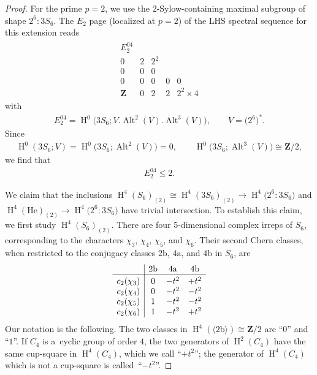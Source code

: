 \documentclass[pdftex]{sigma}
\numberwithin{equation}{section}
\newcommand\bZ{\mathbf Z}
\newcommand\ra{\mathrm a}
\newcommand\rb{\mathrm b}
\DeclareMathOperator\homology{H}
\renewcommand\H{\homology}
\newcommand\<\langle
\renewcommand\>\rangle
\DeclareMathOperator\Alt{Alt}
\begin{document}
\begin{proof}
 For the prime $p=2$, we use the $2$-Sylow-containing maximal subgroup of shape $2^6:3S_6$. The $E_2$ page (localized at $p=2$) of the LHS spectral sequence for this extension reads
 \begin{gather*} \begin{array}{ccccc}
 E_2^{04} \\
 0 & 2 & 2^2 \\
 0 & 0 & 0 \\
 0 & 0 & 0 & 0 & 0 \\
 \bZ & 0 & 2 & 2 & 2^2\times 4
 \end{array} \end{gather*}
 with
 \begin{gather*} E_2^{04} = \H^0\big(3S_6; V . \Alt^2(V) . \Alt^3(V)\big), \qquad V = \big(2^6\big)^*. \end{gather*}
 Since
 \begin{gather*} \H^0(3S_6; V) = \H^0\big(3S_6; \Alt^2(V)\big) = 0, \qquad \H^0\big(3S_6; \Alt^3(V)\big) \cong \bZ/2, \end{gather*}
 we find that
 \begin{gather*} E_2^{04} \leq 2.\end{gather*}

 We claim that the inclusions $\H^4(S_6)_{(2)} \cong \H^4(3S_6)_{(2)} \to \H^4\big(2^6:3S_6\big)$ and $\H^4(\mathrm{He})_{(2)} \to \H^4\big(2^6:3S_6\big)$ have trivial intersection. To establish this claim, we first study $\H^4(S_6)_{(2)}$. There are four 5-dimensional complex irreps of $S_6$, corresponding to the characters $\chi_3$, $\chi_4$, $\chi_5$, and $\chi_6$. Their second Chern classes, when restricted to the conjugacy classes $2\rb$, $4\ra$, and $4\rb$ in $S_6$, are
 \begin{gather*} \begin{array}{c|ccc}
 & 2\rb & 4\ra & 4\rb \\ \hline &&& \\[-10pt]
 c_2(\chi_3) & 0 & -t^2 & +t^2 \\
 c_2(\chi_4) & 0 & -t^2 & -t^2 \\
 c_2(\chi_5) & 1 & -t^2 & -t^2 \\
 c_2(\chi_6) & 1 & -t^2 & +t^2
 \end{array} \end{gather*}
 Our notation is the following. The two classes in $\H^4(\langle 2\rb\rangle) \cong \bZ/2$ are ``$0$'' and ``$1$''. If $C_4$ is a~cyclic group of order $4$, the two generators of $\H^2(C_4)$ have the same cup-square in $\H^4(C_4)$, which we call ``$+t^2$''; the generator of $\H^4(C_4)$ which is not a cup-square is called~``$-t^2$''.


\end{proof}
\end{document}
